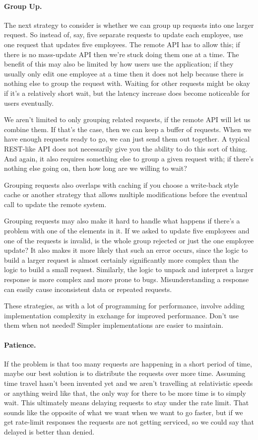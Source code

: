 \paragraph{Group Up.}
The next strategy to consider is whether we can group up requests into one larger request. So instead of, say, five separate requests to update each employee, use one request that updates five employees. The remote API has to allow this; if there is no mass-update API then we're stuck doing them one at a time. The benefit of this may also be limited by how users use the application; if they usually only edit one employee at a time then it does not help because there is nothing else to group the request with. Waiting for other requests might be okay if it's a relatively short wait, but the latency increase does become noticeable for users eventually.

We aren't limited to only grouping related requests, if the remote API will let us combine them. If that's the case, then we can keep a buffer of requests. When we have enough requests ready to go, we can just send them out together. A typical REST-like API does not necessarily give you the ability to do this sort of thing.    And again, it also requires something else to group a given request with; if there's nothing else going on, then how long are we willing to wait?

Grouping requests also overlaps with caching if you choose a write-back style cache or another strategy that allows multiple modifications before the eventual call to update the remote system. 

Grouping requests may also make it hard to handle what happens if there's a problem with one of the elements in it. If we asked to update five employees and one of the requests is invalid, is the whole group rejected or just the one employee update? It also makes it more likely that such an error occurs, since the logic to build a larger request is almost certainly significantly more complex than the logic to build a small request. Similarly, the logic to unpack and interpret a larger response is more complex and more prone to bugs. Misunderstanding a response can easily cause inconsistent data or repeated requests.

These strategies, as with a lot of programming for performance, involve adding implementation complexity in exchange for improved performance. Don't use them when not needed! Simpler implementations are easier to maintain.


\paragraph{Patience.}
If the problem is that too many requests are happening in a short period of time, maybe our best solution is to distribute the requests over more time. Assuming time travel hasn't been invented yet and we aren't travelling at relativistic speeds or anything weird like that, the only way for there to be more time is to simply wait. This ultimately means delaying requests to stay under the rate limit. That sounds like the opposite of what we want when we want to go faster, but if we get rate-limit responses the requests are not getting serviced, so we could say that delayed is better than denied.

